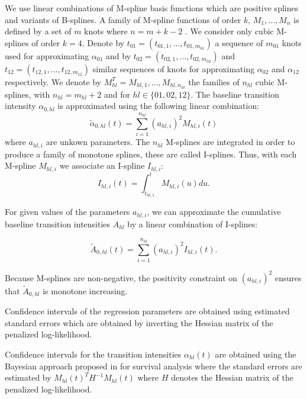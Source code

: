 \documentclass[article]{jss}
\begin{document}
We use linear combinations of M-spline basis functions which are positive splines 
and variants of B-splines.
A family of M-spline functions of order \(k\), \(M_1,\ldots,M_n\) is
defined by a set of \(m\) knots where \(n=m+k-2\) \citep{Ramsay_1988}. We
consider only cubic M-splines of order \(k=4\). Denote by
\(t_{01}=(t_{01,1},\dots,t_{01,m_{01}})\) a sequence of \(m_{01}\) knots
used for 
approximating \(\alpha_{01}\) and by
\(t_{02}=(t_{02,1},\dots,t_{02,m_{02}})\) and
\(t_{12}=(t_{12,1},\dots,t_{12,m_{12}})\) similar sequences of knots for
approximating \(\alpha_{02}\) and \(\alpha_{12}\) respectively. We
denote by \(M_{hl}^T=M_{hl,1},\ldots,M_{hl,n_{hl}}\) the families of
\(n_{hl}\) cubic M-splines, with \(n_{hl}=m_{hl}+2\) and for \(hl \in
\{01,02,12\}\). 
 The baseline transition intensity \(\alpha_{0,hl}\) is approximated using
the following linear combination: 
\begin{equation*}
\tilde
\alpha_{0,hl}(t)=\sum_{i=1}^{n_{hl}} (a_{hl,i})^2 M_{hl,i}(t) 
\end{equation*}
where
\(a_{hl,i}\) are unkown parameters. The \(n_{hl}\) M-splines are integrated in order to
produce a family of monotone splines, these are called
I-splines. Thus, with each M-spline \(M_{hl,i}\) we associate an
I-spline \(I_{hl,i}\): 
\begin{equation*}
I_{hl,i}(t)=\int_{t_{hl,1}}^t M_{hl,i}(u) du.
\end{equation*}

For given values of the parameters \(a_{hl,i}\), we can approximate the
cumulative baseline transition intensities \(A_{hl}\) by a linear
combination of I-splines:

\begin{equation*}
\tilde A_{0,hl}(t)=\sum_{i=1}^{n_{hl}} (a_{hl,i})^2 I_{hl,i}(t).
\end{equation*}

Because M-splines are non-negative, the positivity constraint on
\((a_{hl,i})^2\) ensures that \(\tilde A_{0,hl}\) is monotone increasing.

\medskip

Confidence intervals of the regression parameters are obtained using
estimated standard errors which are obtained by inverting the Hessian
matrix of the penalized log-likelihood.

Confidence intervals for the transition intensities \(\alpha_{hl}(t)\)
are obtained using the Bayesian approach proposed in
\citet{O'Sullivan_1988} for survival analysis where the standard
errors are estimated by \(M_{hl}(t)^T H^{-1} M_{hl}(t)\) where \(H\)
denotes the Hessian matrix of the penalized log-likelihood.
\end{document}
